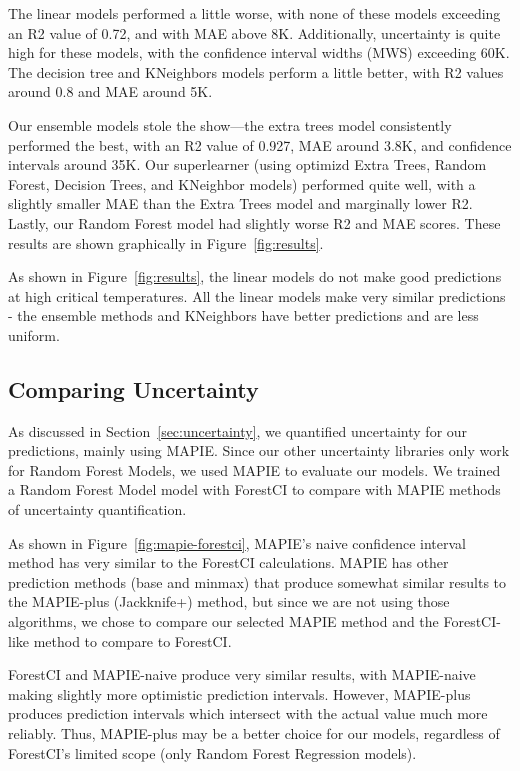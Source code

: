 \documentclass[twocolumn, nofootinbib, secnumarabic, amssymb, nobibnotes, aps, prd]{revtex4-2}
\begin{document}
The linear models performed a little worse, with none of these models exceeding an R2 value of 0.72, and with MAE above 8K. Additionally, uncertainty is quite high for these models, with the confidence interval widths (MWS) exceeding 60K. The decision tree and KNeighbors models perform a little better, with R2 values around 0.8 and MAE around 5K. 

Our ensemble models stole the show—the extra trees model consistently performed the best, with an R2 value of 0.927, MAE around 3.8K, and confidence intervals around 35K. Our superlearner (using optimizd Extra Trees, Random Forest, Decision Trees, and KNeighbor models) performed quite well, with a slightly smaller MAE than the Extra Trees model and marginally lower R2. Lastly, our Random Forest model had slightly worse R2 and MAE scores. These results are shown graphically in Figure~\ref{fig:results}.

As shown in Figure~\ref{fig:results}, the linear models do not make good predictions at high critical temperatures. All the linear models make very similar predictions - the ensemble methods and KNeighbors have better predictions and are less uniform.

\subsection{Comparing Uncertainty}
As discussed in Section~\ref{sec:uncertainty}, we quantified uncertainty for our predictions, mainly using MAPIE. Since our other uncertainty libraries only work for Random Forest Models, we used MAPIE to evaluate our models. We trained a Random Forest Model model with ForestCI to compare with MAPIE methods of uncertainty quantification. 

As shown in Figure~\ref{fig:mapie-forestci}, MAPIE's naive confidence interval method has very similar to the ForestCI calculations. MAPIE has other prediction methods (base and minmax) that produce somewhat similar results to the MAPIE-plus (Jackknife+) method, but since we are not using those algorithms, we chose to compare our selected MAPIE method and the ForestCI-like method to compare to ForestCI.

ForestCI and MAPIE-naive produce very similar results, with MAPIE-naive making slightly more optimistic prediction intervals. However, MAPIE-plus produces prediction intervals which intersect with the actual value much more reliably. Thus, MAPIE-plus may be a better choice for our models, regardless of ForestCI's limited scope (only Random Forest Regression models).
\end{document}

